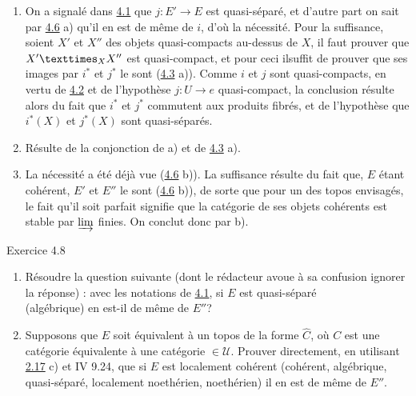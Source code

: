 \documentclass[10pt]{../fichiers-configuration-latex/smfart}
\begin{document}
\begin{enumerate}
\renewcommand{\theenumi}{\alph{enumi}}
\renewcommand{\labelenumi}{\theenumi)}
\item On a signalé dans \hyperref[VI.subsec4.1]{4.1} que $j : E'\to E$ est quasi-séparé, et
  d'autre part on sait par \hyperref[VI.prop4.6]{4.6} a) qu'il en est de même de $i$, d'où la
  nécessité. Pour la suffisance, soient $X'$ et $X''$ des objets
  quasi-compacts au-dessus de $X$, il faut prouver que
  $\fprod{X'}{X''}{X}$ est quasi-compact, et pour ceci
  il\pageoriginale suffit de
  prouver que ses images par $i^{\ast}$ et $j^{\ast}$ le sont (\hyperref[VI.cor4.3]{4.3}
  a)). Comme $i$ et $j$ sont quasi-compacts, en vertu de \hyperref[VI.prop4.2]{4.2} et de
  l'hypothèse $j : U \to e$ quasi-compact, la conclusion résulte alors
  du fait que $i^{\ast}$ et $j^{\ast}$ commutent aux produits fibrés,
  et de l'hypothèse que $i^{\ast}(X)$ et $j^{\ast}(X)$ sont
  quasi-séparés.

\item Résulte de la conjonction de a) et de \hyperref[VI.cor4.3]{4.3} a).

\item La nécessité a été déjà vue (\hyperref[VI.prop4.6]{4.6} b)). La suffisance résulte du
  fait que, $E$ étant cohérent, $E'$ et $E''$ le sont (\hyperref[VI.prop4.6]{4.6} b)), de
  sorte que pour un des topos envisagés, le fait qu'il soit parfait
  signifie que la catégorie de ses objets cohérents est stable par
  $\varinjlim$ finies. On conclut donc par b).
\end{enumerate}

\begin{enonce*}[remark]{Exercice 4.8}
\begin{enumerate}
\renewcommand{\theenumi}{\alph{enumi}}
\renewcommand{\labelenumi}{\theenumi)}
\item Résoudre la question suivante (dont le rédacteur avoue à sa
  confusion ignorer la réponse) : avec les notations de
  \hyperref[VI.subsec4.1]{4.1}, si $E$
  est quasi-séparé \\ (\resp algébrique) en est-il de
  même de $E''$?

\item Supposons que $E$ soit équivalent à un topos de la forme
  $\widehat{C}$, où $C$ est une catégorie équivalente à une catégorie
  $\in 𝒰$. Prouver directement, en utilisant \hyperref[VI.exer2.17]{2.17} c) et IV 9.24, que
  si $E$ est localement cohérent (\resp cohérent, \resp algébrique,
  \resp quasi-séparé, \resp localement noethérien, \resp noethérien)
  il en est de même de $E''$.
\end{enumerate}
\end{enonce*}
\end{document}
